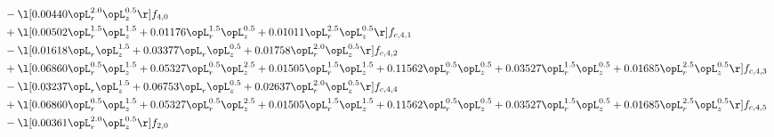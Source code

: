 \begin{alignat}{2}
& - \l[  0.00440 \opL_r^{2.0} \opL_z^{0.5}  \r] f_{4,0} \nonumber \\ 
& + \l[  0.00502 \opL_r^{1.5} \opL_z^{1.5} +  0.01176 \opL_r^{1.5} \opL_z^{0.5} +  0.01011 \opL_r^{2.5} \opL_z^{0.5}  \r] f_{c,4,1} \nonumber \\ 
& - \l[  0.01618 \opL_r \opL_z^{1.5} +  0.03377 \opL_r \opL_z^{0.5} +  0.01758 \opL_r^{2.0} \opL_z^{0.5}  \r] f_{c,4,2} \nonumber \\ 
& + \l[  0.06860 \opL_r^{0.5} \opL_z^{1.5} +  0.05327 \opL_r^{0.5} \opL_z^{2.5} +  0.01505 \opL_r^{1.5} \opL_z^{1.5} +  0.11562 \opL_r^{0.5} \opL_z^{0.5} +  0.03527 \opL_r^{1.5} \opL_z^{0.5} +  0.01685 \opL_r^{2.5} \opL_z^{0.5}  \r] f_{c,4,3} \nonumber \\ 
& - \l[  0.03237 \opL_r \opL_z^{1.5} +  0.06753 \opL_r \opL_z^{0.5} +  0.02637 \opL_r^{2.0} \opL_z^{0.5}  \r] f_{c,4,4} \nonumber \\ 
& + \l[  0.06860 \opL_r^{0.5} \opL_z^{1.5} +  0.05327 \opL_r^{0.5} \opL_z^{2.5} +  0.01505 \opL_r^{1.5} \opL_z^{1.5} +  0.11562 \opL_r^{0.5} \opL_z^{0.5} +  0.03527 \opL_r^{1.5} \opL_z^{0.5} +  0.01685 \opL_r^{2.5} \opL_z^{0.5}  \r] f_{c,4,5} \nonumber \\ 
& - \l[  0.00361 \opL_r^{2.0} \opL_z^{0.5}  \r] f_{2,0} \nonumber \\ 
\end{alignat} 


